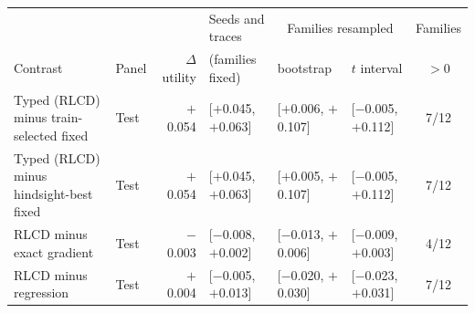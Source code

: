 \begin{tabular}{llrlllc}
\toprule
 & & & Seeds and traces & \multicolumn{2}{c}{Families resampled} & Families \\
Contrast & Panel & $\Delta$ utility & (families fixed) & bootstrap & $t$ interval & $>0$ \\
\midrule
Typed (RLCD) minus train-selected fixed & Test & $+$0.054 & [$+$0.045, $+$0.063] & [$+$0.006, $+$0.107] & [$-$0.005, $+$0.112] & 7/12 \\
\midrule
Typed (RLCD) minus hindsight-best fixed & Test & $+$0.054 & [$+$0.045, $+$0.063] & [$+$0.005, $+$0.107] & [$-$0.005, $+$0.112] & 7/12 \\
\midrule
RLCD minus exact gradient & Test & $-$0.003 & [$-$0.008, $+$0.002] & [$-$0.013, $+$0.006] & [$-$0.009, $+$0.003] & 4/12 \\
\midrule
RLCD minus regression & Test & $+$0.004 & [$-$0.005, $+$0.013] & [$-$0.020, $+$0.030] & [$-$0.023, $+$0.031] & 7/12 \\
\bottomrule
\end{tabular}
